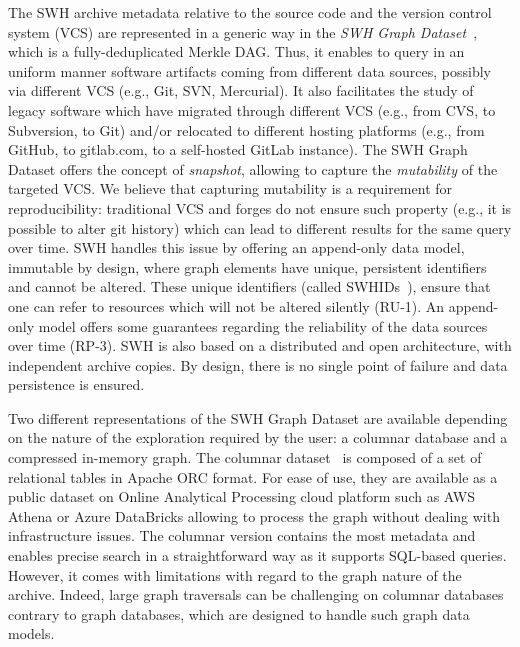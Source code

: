 The SWH archive metadata relative to the source code and the version control system (VCS) are represented in a generic way in the \emph{SWH Graph Dataset}~\cite{pietri2019software}, which is a fully-deduplicated Merkle DAG.
Thus, it enables to query in an uniform manner software artifacts coming from different data sources, possibly via different VCS (e.g., Git, SVN, Mercurial).
It also facilitates the study of legacy software which have migrated through different VCS (e.g., from CVS, to Subversion, to Git) and/or relocated to different hosting platforms (e.g., from GitHub, to gitlab.com, to a self-hosted GitLab instance).
The SWH Graph Dataset offers the concept of \emph{snapshot}, allowing to capture the \emph{mutability} of the targeted VCS.  
We believe that capturing mutability is a requirement for reproducibility: traditional VCS and forges do not ensure such property (e.g., it is possible to alter git history) which can lead to different results for the same query over time. 
SWH handles this issue by offering an append-only data model, immutable by design, where graph elements have unique, persistent identifiers and cannot be altered. 
These unique identifiers (called SWHIDs~\cite{DBLP:journals/cse/CosmoGZ20}), ensure that one can refer to resources which will not be altered silently (RU-1).
An append-only model offers some guarantees regarding the reliability of the data sources over time (RP-3). SWH is also based on a distributed and open architecture, with independent archive copies. By design, there is no single point of failure and data persistence is ensured.

Two different representations of the SWH Graph Dataset are available depending on the nature of the exploration required by the user: a columnar database and a compressed in-memory graph.
The columnar dataset~\cite{pietri2019software} is composed of a set of relational tables in Apache ORC format. 
For ease of use, they are available as a public dataset on Online Analytical Processing cloud platform such as AWS Athena or Azure DataBricks allowing to process the graph without dealing with infrastructure issues.  
The columnar version contains the most metadata and enables precise search in a straightforward way as it supports SQL-based queries.
However, it comes with limitations with regard to the graph nature of the archive. 
Indeed, large graph traversals can be challenging on columnar databases contrary to graph databases, which are designed to handle such graph data models.

